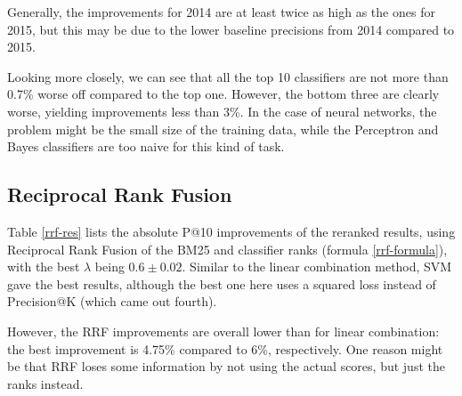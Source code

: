 Generally, the improvements for 2014 are at least 
twice as high as the ones for 2015, but this may be due to the lower baseline precisions from 2014 compared to 2015.

Looking more closely, we can see that all the top 10 classifiers are not more than 0.7\% worse off compared to the top one. However, the bottom three
are clearly worse, yielding improvements less than 3\%. In the case of neural networks, the problem might be the small size of the training data,
while the Perceptron and Bayes classifiers are too naive for this kind of task.

\subsection{Reciprocal Rank Fusion}
Table \ref{rrf-res} lists the absolute P@10 improvements of the reranked results, using Reciprocal Rank Fusion of the BM25 and classifier ranks (formula \ref{rrf-formula}),
with the best $\lambda$ being $0.6\pm 0.02$.
Similar to the linear combination method, SVM gave the best results, although the best one here uses a squared loss instead of 
Precision@K (which came out fourth).

However, the RRF improvements are overall lower than for linear combination: the best improvement is 4.75\% compared to 6\%, respectively. One reason
might be that RRF loses some information by not using the actual scores, but just the ranks instead.

